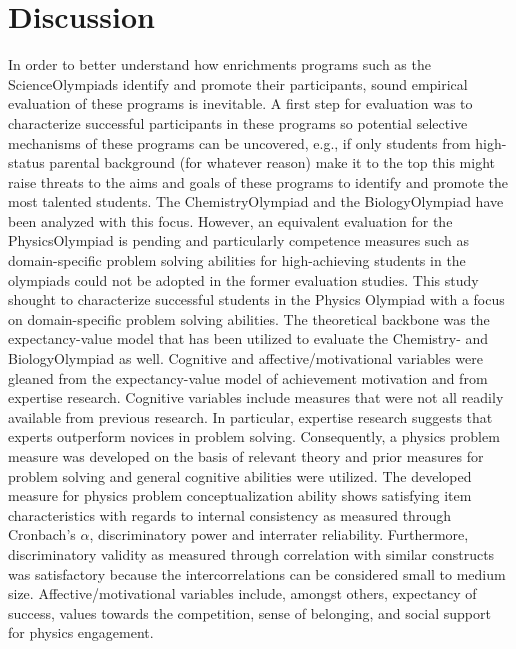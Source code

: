 \documentclass[]{interact}
\begin{document}


\section{Discussion}

In order to better understand how enrichments programs such as the ScienceOlympiads identify and promote their participants, sound empirical evaluation of these programs is inevitable. A first step for evaluation was to characterize successful participants in these programs so potential selective mechanisms of these programs can be uncovered, e.g., if only students from high-status parental background (for whatever reason) make it to the top this might raise threats to the aims and goals of these programs to identify and promote the most talented students. The ChemistryOlympiad and the BiologyOlympiad have been analyzed with this focus. However, an equivalent evaluation for the PhysicsOlympiad is pending and particularly competence measures such as domain-specific problem solving abilities for high-achieving students in the olympiads could not be adopted in the former evaluation studies. This study shought to characterize successful students in the Physics Olympiad with a focus on domain-specific problem solving abilities. The theoretical backbone was the expectancy-value model that has been utilized to evaluate the Chemistry- and BiologyOlympiad as well. Cognitive and affective/motivational variables were gleaned from the expectancy-value model of achievement motivation and from expertise research. Cognitive variables include measures that were not all readily available from previous research. In particular, expertise research suggests that experts outperform novices in problem solving. Consequently, a physics problem measure was developed on the basis of relevant theory and prior measures for problem solving and general cognitive abilities were utilized. The developed measure for physics problem conceptualization ability shows satisfying item characteristics with regards to internal consistency as measured through Cronbach's $\alpha$, discriminatory power and interrater reliability. Furthermore, discriminatory validity as measured through correlation with similar constructs \citep{Campbell.1959} was satisfactory because the intercorrelations can be considered small to medium size. Affective/motivational variables include, amongst others, expectancy of success, values towards the competition, sense of belonging, and social support for physics engagement.
\end{document}
